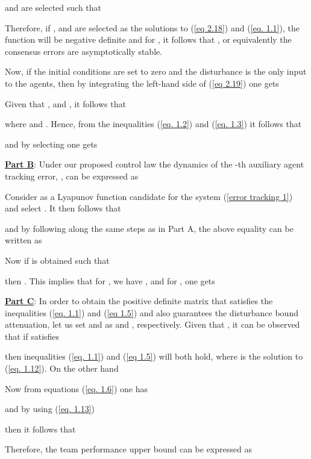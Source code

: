 \documentclass[12pt,draftcls,onecolumn]{IEEEtran}
\begin{document}
and  are selected such that

Therefore, if ,  and  are selected as the solutions to (\ref{eq 2.18}) and (\ref{eq. 1.1}),  the function  will be negative definite  and for , it follows that  , or equivalently the consensus errors are asymptotically stable. \par
Now, if the initial conditions are set to zero and the disturbance is the only input to the agents, then by integrating the left-hand side of (\ref{eq 2.19}) one gets 

Given that , 
		  and ,   it follows that  

where  and .  Hence, from the inequalities (\ref{eq. 1.2}) and (\ref{eq. 1.3}) it follows that  

and by selecting  one gets  
\par
\underline{\textbf{Part B}}: Under our proposed  control law the dynamics of the -th auxiliary agent tracking error, , can be expressed as 

Consider  as a Lyapunov function candidate for the system (\ref{error tracking 1}) and  select . It then follows that 

and by following along the same steps as in Part A, the above equality can be written as 

Now if  is obtained such that 

then . This implies that for , we have , and for , one gets

\underline{\textbf{Part C}}: In order to obtain the positive definite matrix  that satisfies the inequalities (\ref{eq. 1.1}) and (\ref{eq 1.5}) and also guarantees the disturbance bound attenuation, let us set   and  as  and , respectively. Given that , it can be observed that if  satisfies 

then inequalities (\ref{eq. 1.1}) and (\ref{eq 1.5}) will both hold, where  is the solution to (\ref{eq. 1.12}). 
On the other hand

Now from equations (\ref{eq. 1.6}) one has

and by using  (\ref{eq. 1.13})

then it follows that 

Therefore, the team  performance upper bound can be expressed as
\end{document}

